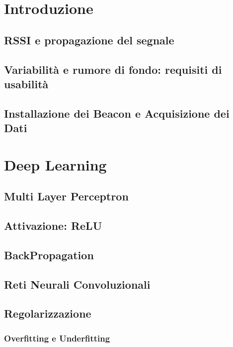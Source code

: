 \documentclass[12pt]{report}
\begin{document}
\begin{abstract}
  
\end{abstract}

\tableofcontents

\chapter{Introduzione}

\section{RSSI e propagazione del segnale}
\section{Variabilità e rumore di fondo: requisiti di usabilità}
\section{Installazione dei Beacon e Acquisizione dei Dati}

\chapter{Deep Learning}


\section{Multi Layer Perceptron}
\section{Attivazione: ReLU}
\section{BackPropagation}
\section{Reti Neurali Convoluzionali}
\section{Regolarizzazione}
\subsection{Overfitting e Underfitting}
\end{document}
